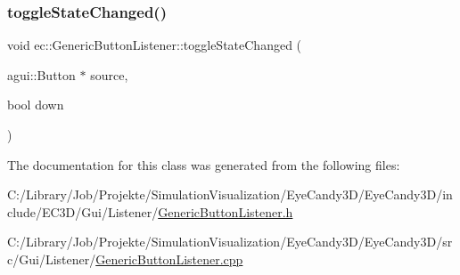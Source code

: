 \subsubsection{\texorpdfstring{toggle\+State\+Changed()}{toggleStateChanged()}}
{\footnotesize\ttfamily void ec\+::\+Generic\+Button\+Listener\+::toggle\+State\+Changed (\begin{DoxyParamCaption}\item[{agui\+::\+Button $\ast$}]{source,  }\item[{bool}]{down }\end{DoxyParamCaption})\hspace{0.3cm}{\ttfamily [override]}}



The documentation for this class was generated from the following files\+:\begin{DoxyCompactItemize}
\item 
C\+:/\+Library/\+Job/\+Projekte/\+Simulation\+Visualization/\+Eye\+Candy3\+D/\+Eye\+Candy3\+D/include/\+E\+C3\+D/\+Gui/\+Listener/\mbox{\hyperlink{_generic_button_listener_8h}{Generic\+Button\+Listener.\+h}}\item 
C\+:/\+Library/\+Job/\+Projekte/\+Simulation\+Visualization/\+Eye\+Candy3\+D/\+Eye\+Candy3\+D/src/\+Gui/\+Listener/\mbox{\hyperlink{_generic_button_listener_8cpp}{Generic\+Button\+Listener.\+cpp}}\end{DoxyCompactItemize}
